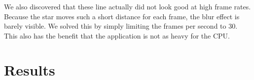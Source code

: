 \documentclass[a4paper]{article}
\begin{document}
We also discovered that these line actually did not look good at high frame rates.
Because the star moves such a short distance for each frame, the blur effect is barely visible.
We solved this by simply limiting the frames per second to 30.
This also has the benefit that the application is not as heavy for the CPU.

\section{Results}
\end{document}
